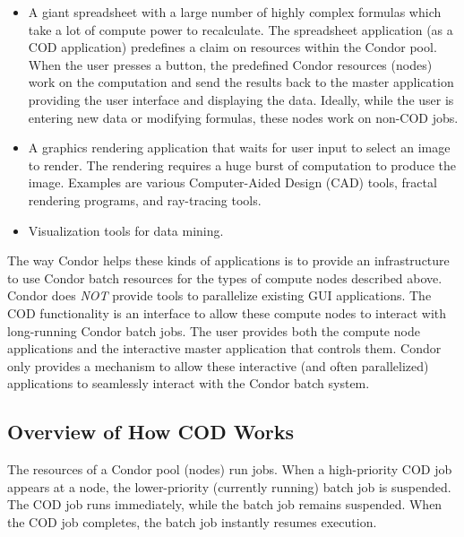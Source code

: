 \begin{itemize}

\item A giant spreadsheet with a large number of highly complex
  formulas which take a lot of compute power to recalculate.
  The spreadsheet application (as a COD application) predefines
  a claim on resources within the Condor pool.
  When the user presses a \verb@recalculate@ button, 
  the predefined Condor resources (nodes) 
  work on the computation and send the results
  back to the master application providing the user interface and
  displaying the data.
  Ideally, while the user is entering new data or modifying formulas,
  these nodes work on non-COD jobs.

\item A graphics rendering application that waits for user
  input to select an image to render.
  The rendering requires a huge burst
  of computation to produce the image.
  Examples are various Computer-Aided Design (CAD) tools, fractal
  rendering programs, and ray-tracing tools.
 
\item Visualization tools for data mining.

\end{itemize}

The way Condor helps these kinds of applications is to provide an
infrastructure to use Condor batch resources for the types of compute
nodes described above.
Condor does \emph{NOT} provide tools to parallelize existing GUI
applications.
The COD functionality is an interface to allow these compute nodes to
interact with long-running Condor batch jobs.
The user provides both the compute node applications and the
interactive master application that controls them.
Condor only provides a mechanism to allow these interactive (and often
parallelized) applications to seamlessly interact with the Condor
batch system.


\subsection{\label{sec:cod-overview}
Overview of How COD Works}

The resources of a Condor pool (nodes)
run jobs.
When a high-priority COD job appears at a node,
the lower-priority (currently running) batch job is
suspended.
The COD job runs immediately, while the batch job remains suspended.
When the COD job completes, the batch job instantly resumes execution.

